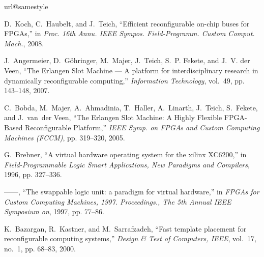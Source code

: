 \documentclass[10pt,journal]{IEEEtran}
\begin{document}
\begin{thebibliography}{10}
\providecommand{\url}[1]{#1}
\csname url@samestyle\endcsname
\providecommand{\newblock}{\relax}
\providecommand{\bibinfo}[2]{#2}
\providecommand{\BIBentrySTDinterwordspacing}{\spaceskip=0pt\relax}
\providecommand{\BIBentryALTinterwordstretchfactor}{4}
\providecommand{\BIBentryALTinterwordspacing}{\spaceskip=\fontdimen2\font plus
\BIBentryALTinterwordstretchfactor\fontdimen3\font minus
  \fontdimen4\font\relax}
\providecommand{\BIBforeignlanguage}[2]{{\expandafter\ifx\csname l@#1\endcsname\relax
\typeout{** WARNING: IEEEtran.bst: No hyphenation pattern has been}\typeout{** loaded for the language `#1'. Using the pattern for}\typeout{** the default language instead.}\else
\language=\csname l@#1\endcsname
\fi
#2}}
\providecommand{\BIBdecl}{\relax}
\BIBdecl

D.~Koch, C.~Haubelt, and J.~Teich, ``Efficient reconfigurable on-chip buses for
  {FPGAs},'' in \emph{Proc. 16th Annu. IEEE Sympos. Field-Programm. Custom
  Comput. Mach.}, 2008.

J.~Angermeier, D.~G{\"o}hringer, M.~Majer, J.~Teich, S.~P. Fekete, and J.~V.
  der Veen, ``The {E}rlangen {S}lot {M}achine --- {A} platform for
  interdisciplinary research in dynamically reconfigurable computing,''
  \emph{Information Technology}, vol.~49, pp. 143--148, 2007.

C.~Bobda, M.~Majer, A.~Ahmadinia, T.~Haller, A.~Linarth, J.~Teich, S.~Fekete,
  and J.~van~der Veen, ``{The Erlangen Slot Machine: {A} Highly Flexible
  FPGA-Based Reconfigurable Platform},'' \emph{IEEE Symp. on FPGAs and Custom
  Computing Machines (FCCM)}, pp. 319--320, 2005.

G.~Brebner, ``A virtual hardware operating system for the xilinx {XC6200},'' in
  \emph{{Field-Programmable} Logic Smart Applications, New Paradigms and
  Compilers}, 1996, pp. 327--336.

------, ``The swappable logic unit: a paradigm for virtual hardware,'' in
  \emph{{FPGAs} for Custom Computing Machines, 1997. Proceedings., The 5th
  Annual {IEEE} Symposium on}, 1997, pp. 77--86.

K.~Bazargan, R.~Kastner, and M.~Sarrafzadeh, ``Fast template placement for
  reconfigurable computing systems,'' \emph{Design \& Test of Computers,
  {IEEE}}, vol.~17, no.~1, pp. 68--83, 2000.


\end{thebibliography}
\end{document}
